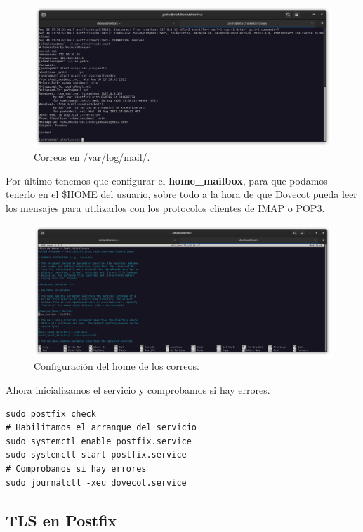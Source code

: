 \begin{figure}[H]
	\centering
	\includegraphics[scale=0.30]{07}
	\caption{Correos en /var/log/mail/.}
\end{figure}

Por último tenemos que configurar el \textbf{home\_mailbox}, para que podamos tenerlo en el \$HOME del usuario, sobre todo a la hora de que Dovecot pueda leer los mensajes para utilizarlos con los protocolos clientes de IMAP o POP3.

\begin{figure}[H]
	\centering
	\includegraphics[scale=0.25]{06}
	\caption{Configuración del home de los correos.}
\end{figure}

Ahora inicializamos el servicio y comprobamos si hay errores.
\begin{lstlisting}[style=mybash]
sudo postfix check
# Habilitamos el arranque del servicio
sudo systemctl enable postfix.service
sudo systemctl start postfix.service
# Comprobamos si hay errores
sudo journalctl -xeu dovecot.service
\end{lstlisting}


\subsection{TLS en Postfix}

